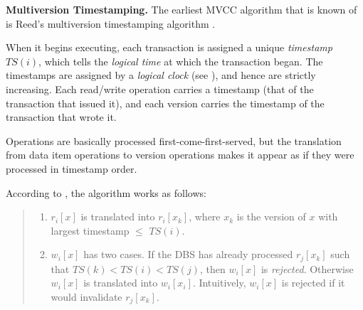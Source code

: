 \noindent
{\bf Multiversion Timestamping.}
The earliest MVCC algorithm that is known of is Reed's multiversion timestamping algorithm \cite{Ree78}.

When it begins executing, each transaction is assigned a unique \emph{timestamp} $TS(i)$, which tells the \emph{logical time} at which the transaction began. The timestamps are assigned by a \emph{logical clock} (see \cite{Lam78}), and hence are strictly increasing. Each read/write operation carries a timestamp (that of the transaction that issued it), and each version carries the timestamp of the transaction that wrote it.

Operations are basically processed first-come-first-served, but the translation from data item operations to version operations makes it appear as if they were processed in timestamp order.

According to \cite{BG83}, the algorithm works as follows:
\begin{quote}
  \begin{enumerate}[(1)]
    \item $r_i[x]$ is translated into $r_i[x_k]$, where $x_k$ is the version of $x$ with largest timestamp $\leq$ $TS(i)$.

    \item $w_i[x]$ has two cases. If the DBS has already processed $r_j[x_k]$ such that $TS(k) < TS(i) < TS(j)$, then $w_i[x]$ is \emph{rejected}. Otherwise $w_i[x]$ is translated into $w_i[x_i]$. Intuitively, $w_i[x]$ is rejected if it would invalidate $r_j[x_k]$.
  \end{enumerate}
\end{quote}

